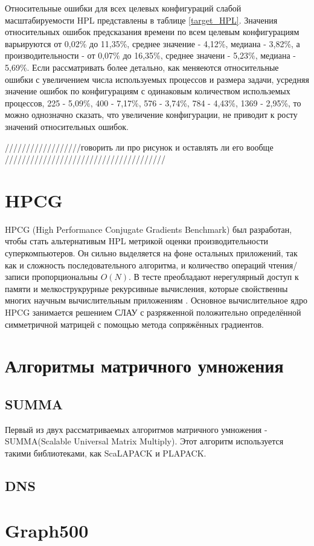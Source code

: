 	Относительные ошибки для всех целевых конфигураций слабой масштабируемости HPL представлены в таблице \ref{target_HPL}. Значения относительных ошибок предсказания времени по всем целевым конфигурациям варьируются от 0,02\% до 11,35\%, среднее значение - 4,12\%, медиана - 3,82\%, а производительности - от 0,07\% до 16,35\%, среднее значени - 5,23\%, медиана - 5,69\%. Если рассматривать более детально, как меняеются относительные ошибки с увеличением числа используемых процессов и размера задачи, усредняя значение ошибок по конфигурациям с одинаковым количеством использемых процессов, 225 - 5,09\%, 400 - 7,17\%, 576 - 3,74\%, 784 - 4,43\%, 1369 - 2,95\%, то можно однозначно сказать, что увеличение конфигурации, не приводит к росту значений относительных ошибок. 

	//////////////////говорить ли про рисунок и оставлять ли его вообще //////////////////////////////////////

	\section{HPCG}

	HPCG (High Performance Conjugate Gradients Benchmark) был разработан, чтобы стать альтернативым HPL метрикой оценки производительности суперкомпьютеров. Он сильно выделяется на фоне остальных приложений, так как и сложность последовательного алгоритма, и количество операций чтения/записи пропорциональны \(O(N)\). В тесте преобладают нерегулярный доступ к памяти и мелкострукрурные рекурсивные вычисления, которые свойственны многих научным вычислительным приложениям \cite{HPCG}. Основное вычислительное ядро HPCG занимается решением СЛАУ с разряженной положительно определённой симметричной матрицей с помощью метода сопряжённых градиентов.

	


	\section{Алгоритмы матричного умножения}
		\subsection{SUMMA}
		Первый из двух рассматриваемых алгоритмов матричного умножения - SUMMA(Scalable Universal Matrix Multiply)\cite{SUMMA}. Этот алгоритм используется такими библиотеками, как ScaLAPACK и PLAPACK.

		\subsection{DNS}

	\section{Graph500}
